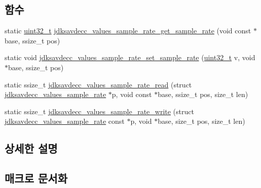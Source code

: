 \subsection*{함수}
\begin{DoxyCompactItemize}
\item 
static \hyperlink{parse_8c_a6eb1e68cc391dd753bc8ce896dbb8315}{uint32\+\_\+t} \hyperlink{group__values__sample__rate_ga5a6516a3d0a0d2b8c1f6f00f18c1d732}{jdksavdecc\+\_\+values\+\_\+sample\+\_\+rate\+\_\+get\+\_\+sample\+\_\+rate} (void const $\ast$base, ssize\+\_\+t pos)
\item 
static void \hyperlink{group__values__sample__rate_ga1a9dc6ccdfbe626622668ab6db5db5b8}{jdksavdecc\+\_\+values\+\_\+sample\+\_\+rate\+\_\+set\+\_\+sample\+\_\+rate} (\hyperlink{parse_8c_a6eb1e68cc391dd753bc8ce896dbb8315}{uint32\+\_\+t} v, void $\ast$base, ssize\+\_\+t pos)
\item 
static ssize\+\_\+t \hyperlink{group__values__sample__rate_ga264ae4d66dbc05c8668bda25c763af5f}{jdksavdecc\+\_\+values\+\_\+sample\+\_\+rate\+\_\+read} (struct \hyperlink{structjdksavdecc__values__sample__rate}{jdksavdecc\+\_\+values\+\_\+sample\+\_\+rate} $\ast$p, void const $\ast$base, ssize\+\_\+t pos, size\+\_\+t len)
\item 
static ssize\+\_\+t \hyperlink{group__values__sample__rate_ga343b6a388e62839dd49fa098874f620e}{jdksavdecc\+\_\+values\+\_\+sample\+\_\+rate\+\_\+write} (struct \hyperlink{structjdksavdecc__values__sample__rate}{jdksavdecc\+\_\+values\+\_\+sample\+\_\+rate} const $\ast$p, void $\ast$base, size\+\_\+t pos, size\+\_\+t len)
\end{DoxyCompactItemize}


\subsection{상세한 설명}


\subsection{매크로 문서화}
